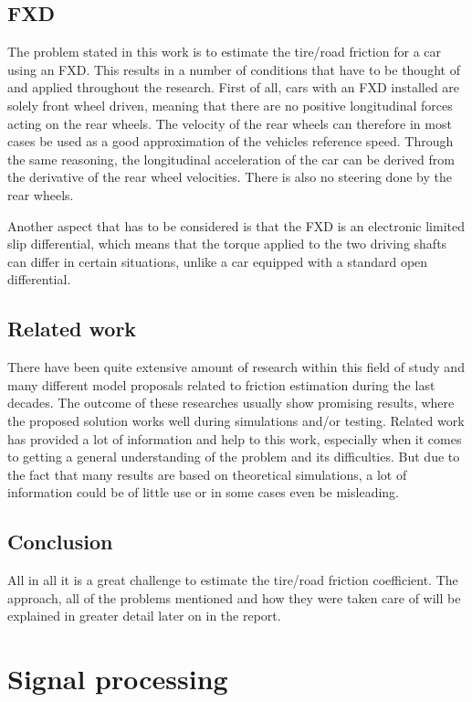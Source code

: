 \subsection{FXD}
The problem stated in this work is to estimate the tire/road friction for a car using an FXD. This results in a number of conditions that have to be thought of and applied throughout the research. First of all, cars with an FXD installed are solely front wheel driven, meaning that there are no positive longitudinal forces acting on the rear wheels. The velocity of the rear wheels can therefore in most cases be used as a good approximation of the vehicles reference speed. Through the same reasoning, the longitudinal acceleration of the car can be derived from the derivative of the rear wheel velocities. There is also no steering done by the rear wheels.

Another aspect that has to be considered is that the FXD is an electronic limited slip differential, which means that the torque applied to the two driving shafts can differ in certain situations, unlike a car equipped with a standard open differential.

\subsection{Related work}
There have been quite extensive amount of research within this field of study and many different model proposals related to friction estimation during the last decades. The outcome of these researches usually show promising results, where the proposed solution works well during simulations and/or testing. Related work has provided a lot of information and help to this work, especially when it comes to getting a general understanding of the problem and its difficulties. But due to the fact that many results are based on theoretical simulations, a lot of information could be of little use or in some cases even be misleading.

\subsection{Conclusion}
All in all it is a great challenge to estimate the tire/road friction coefficient.  The approach, all of the problems mentioned and how they were taken care of will be explained in greater detail later on in the report.

\section{Signal processing}

